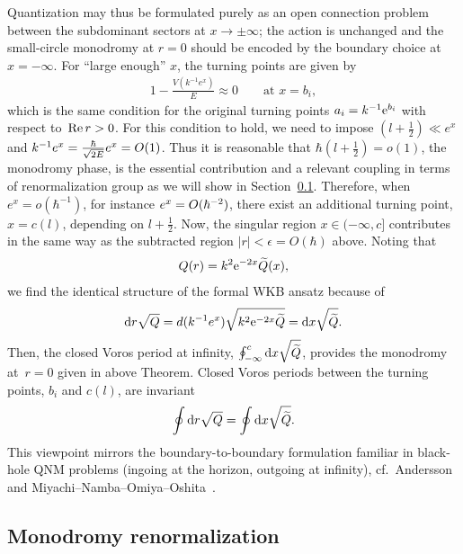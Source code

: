 Quantization may thus be formulated purely as an open connection problem between the subdominant sectors at $x\to\pm\infty$; the action is unchanged and the small-circle monodromy at $r=0$ should be encoded by the boundary choice at $x=-\infty$.
For ``large enough'' $x$, the turning points are given by
\begin{align}
    1-\frac{V(k^{-1}e^x)}{E} \approx 0 \qquad \text{at $x=b_i$},
\end{align}
which is the same condition for the original turning points $a_i=k^{-1}\mathrm{e}^{b_i}$ with respect to~$\operatorname{Re} r>0$.
For this condition to hold, we need to impose $(l+\frac{1}{2})\ll e^x$ and $k^{-1} e^x=\frac{\hbar}{\sqrt{2E}}e^x=O(1)$.
Thus it is reasonable that $\hbar(l+\frac{1}{2})=o(1)$, the monodromy phase, is the essential contribution and a relevant coupling in terms of renormalization group as we will show in Section~\ref{src:2510_11766:sec:renorm}.
Therefore, when $e^x = o(\hbar^{-1})$, for instance $e^x = O(\hbar^{-2})$, there exist an additional turning point, $x=c(l)$, depending on $l+\frac{1}{2}$.
Now, the singular region $x\in(-\infty,c]$ contributes in the same way as the subtracted region $|r|<\epsilon=O(\hbar)$ above.
Noting that
\begin{align}
    Q(r) = k^{2} \mathrm{e}^{-2x} \widetilde{Q}(x) ,
\end{align}
we find the identical structure of the formal WKB ansatz because of
\begin{align}
    \mathrm{d} r \sqrt{Q} = d(k^{-1}e^x) \sqrt{k^2 \mathrm{e}^{-2x}\widetilde{Q}} = \mathrm{d} x \sqrt{\widetilde{Q}} .
\end{align}
Then, the closed Voros period at infinity, $\oint_{-\infty}^c \mathrm{d} x\sqrt{\widetilde{Q}}$, provides the monodromy at~$r=0$ given in above Theorem.
Closed Voros periods between the turning points, $b_i$ and $c(l)$, are invariant
\begin{equation}
\oint \mathrm{d} r \sqrt{Q}=\oint \mathrm{d} x \sqrt{\widetilde{Q}} .
\end{equation}
This viewpoint mirrors the boundary-to-boundary formulation familiar in black-hole QNM
problems (ingoing at the horizon, outgoing at infinity), cf.\ Andersson~\cite{Andersson:1995zk} and Miyachi--Namba--Omiya--Oshita~\cite{Miyachi:2025ptm}.
\subsection{Monodromy renormalization}\label{src:2510_11766:sec:renorm}
